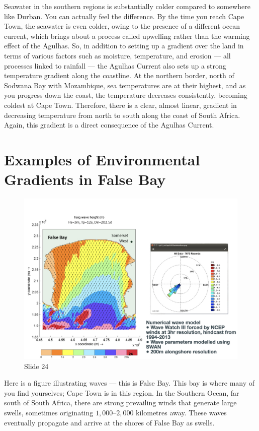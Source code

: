 \documentclass[
  12pt,
]{book}
\begin{document}
Seawater in the southern regions is substantially colder compared to
somewhere like Durban. You can actually feel the difference. By the time
you reach Cape Town, the seawater is even colder, owing to the presence
of a different ocean current, which brings about a process called
upwelling rather than the warming effect of the Agulhas. So, in addition
to setting up a gradient over the land in terms of various factors such
as moisture, temperature, and erosion --- all processes linked to
rainfall --- the Agulhas Current also sets up a strong temperature
gradient along the coastline. At the northern border, north of Sodwana
Bay with Mozambique, sea temperatures are at their highest, and as you
progress down the coast, the temperature decreases consistently,
becoming coldest at Cape Town. Therefore, there is a clear, almost
linear, gradient in decreasing temperature from north to south along the
coast of South Africa. Again, this gradient is a direct consequence of
the Agulhas Current.

\section{Examples of Environmental Gradients in False
Bay}\label{examples-of-environmental-gradients-in-false-bay}

\begin{figure}[ht]
\centering
\includegraphics[width=0.8\linewidth]{../images/BDC334/BDC334-024.jpeg}
\caption*{Slide 24}
\end{figure}

Here is a figure illustrating waves --- this is False Bay. This bay is
where many of you find yourselves; Cape Town is in this region. In the
Southern Ocean, far south of South Africa, there are strong prevailing
winds that generate large swells, sometimes originating
\(1{,}000\)--\(2{,}000\) kilometres away. These waves eventually
propagate and arrive at the shores of False Bay as swells.
\end{document}
